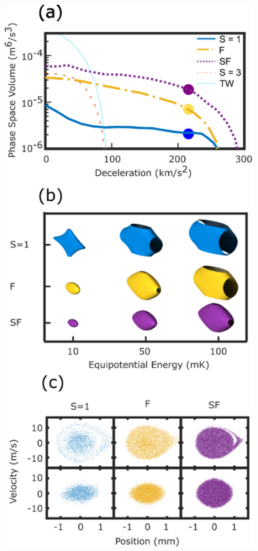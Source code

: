 \documentclass[%
 reprint,
 amsmath,amssymb,
 aps,
prl,
]{revtex4-1}
\begin{document}
\begin{figure}[h]
\includegraphics[width=.8\linewidth]{Figure2.png}%
\caption{
}
\end{figure}
\end{document}
